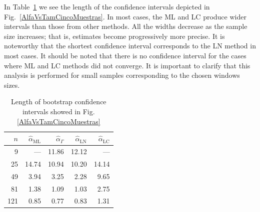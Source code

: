 \documentclass[twocolumn]{svjour3}
\begin{document}
In Table~\ref{tab:LongIC} we see the length of the confidence intervals depicted in Fig.~\ref{AlfaVsTamCincoMuestras}.
In most cases, the ML and LC produce wider intervals than those from other methods. 
All the widths decrease as the sample size increases; that is, estimates become progressively more precise. 
It is noteworthy that the shortest confidence interval corresponds to the LN method in most cases. 
It should be noted that there is no confidence interval for the cases where ML and LC methods did not converge.
It is important to clarify that this analysis is performed for small samples corresponding to the chosen windows sizes. 

\begin{table}[htb]
\centering
\caption{\label{tab:LongIC}Length of bootstrap confidence intervals showed in Fig.\ref{AlfaVsTamCincoMuestras}}
\begin{tabular}{*5{r}}
	\toprule 
	$n$     &  $\widehat{\alpha}_{\text{{ML}}}$    &  $\widehat{\alpha}_{\Gamma}$  &  $\widehat{\alpha}_{\text{{LN}}}$ &  $\widehat{\alpha}_{\text{{LC}}}$ \\
	\midrule
	9     &    ---  & 11.86 & 12.12 & --- \\
	25    & 14.74 & 10.94 & 10.20 & 14.14 \\
	49    & 3.94  & 3.25  & 2.28  & 9.65 \\
	81    & 1.38  & 1.09  & 1.03  & 2.75 \\
	121   & 0.85  & 0.77  & 0.83  & 1.31 \\
	\bottomrule
\end{tabular}
\end{table}%



\end{document}
